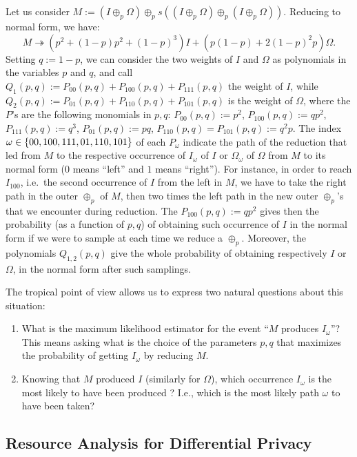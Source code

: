 Let us consider $M:=(I\oplus_p\Omega)\oplus_ps((I\oplus_p\Omega)\oplus_p(I\oplus_p\Omega))$.
Reducing to normal form, we have:
\[
 M\twoheadrightarrow (p^2+(1-p)p^2+(1-p)^3)I+(p(1-p)+2(1-p)^2p)\Omega.
\]
Setting $q:=1-p$, we can consider the two weights of $I$ and $\Omega$ as polynomials in the variables $p$ and $q$, and call
$Q_1(p,q):=P_{00}(p,q)+P_{100}(p,q)+P_{111}(p,q)$ the weight of $I$, while
$Q_2(p,q):=P_{01}(p,q)+P_{110}(p,q)+P_{101}(p,q)$ is the weight of $\Omega$,
where the $P$'s are the following monomials in $p,q$:
$P_{00}(p,q):=p^2$,
$P_{100}(p,q):=qp^2$,
$P_{111}(p,q):=q^3$,
$P_{01}(p,q):=pq$,
$P_{110}(p,q)=P_{101}(p,q):=q^2p$.
The index $\omega\in\{00,100,111,01,110,101\}$ of each $P_\omega$ indicate the path of the reduction that led from $M$ to the respective occurrence of $I_\omega$ of $I$ or $\Omega_\omega$ of $\Omega$ from $M$ to its normal form ($0$ means ``left'' and $1$ means ``right'').
For instance, in order to reach $I_{100}$, i.e.\ the second occurrence of $I$ from the left in $M$, we have to take the right path in the outer $\oplus_p$ of $M$, then two times the left path in the new outer $\oplus_p$'s that we encounter during reduction.
The $P_{100}(p,q):=qp^2$ gives then the probability (as a function of $p,q$) of obtaining such occurrence of $I$ in the normal form if we were to sample at each time we reduce a $\oplus_p$.
Moreover, the polynomials $Q_{1,2}(p,q)$ give the whole probability of obtaining respectively $I$ or $\Omega$, in the normal form after such samplings.

The tropical point of view allows us to express two natural questions about this situation:
\begin{enumerate}
 \item What is the maximum likelihood estimator for the event ``$M$ produces $I_\omega$''?
This means asking what is the choice of the parameters $p,q$ that maximizes the probability of getting $I_\omega$ by reducing $M$.
 \item Knowing that $M$ produced $I$ (similarly for $\Omega$), which occurrence $I_\omega$ is the most likely to have been produced ? I.e., which is the most likely path $\omega$ to have been taken?
\end{enumerate}



\subsection{Resource Analysis for Differential Privacy}

